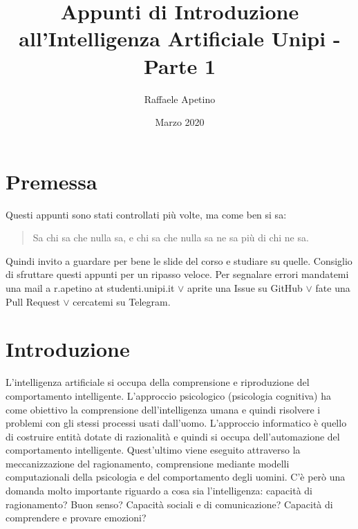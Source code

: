 \documentclass{article}
\title{Appunti di Introduzione all'Intelligenza Artificiale Unipi - Parte 1}
\author{Raffaele Apetino}
\date{Marzo 2020}
\begin{document}
\maketitle

\tableofcontents{}
\clearpage
\section{Premessa}
Questi appunti sono stati controllati più volte, ma come ben si sa:
\begin{quote}
    Sa chi sa che nulla sa, e chi sa che nulla sa ne sa più di chi ne sa.
\end{quote}
Quindi invito a guardare per bene le slide del corso e studiare su quelle. Consiglio di sfruttare questi appunti per un ripasso veloce. Per segnalare errori mandatemi una mail a r.apetino at studenti.unipi.it $\lor$ aprite una Issue su GitHub $\lor$ fate una Pull Request $\lor$ cercatemi su Telegram.

\section{Introduzione}
L'intelligenza artificiale si occupa della comprensione e riproduzione del comportamento intelligente. L'approccio psicologico (psicologia cognitiva) ha come obiettivo la comprensione dell'intelligenza umana e quindi risolvere i problemi con gli stessi processi usati dall'uomo. L'approccio informatico è quello di costruire entità dotate di razionalità e quindi si occupa dell'automazione del comportamento intelligente. Quest'ultimo viene eseguito attraverso la meccanizzazione del ragionamento, comprensione mediante modelli computazionali della psicologia e del comportamento degli uomini. \newline 
C'è però una domanda molto importante riguardo a cosa sia l'intelligenza: capacità di ragionamento? Buon senso? Capacità sociali e di comunicazione? Capacità di comprendere e provare emozioni?
\end{document}
